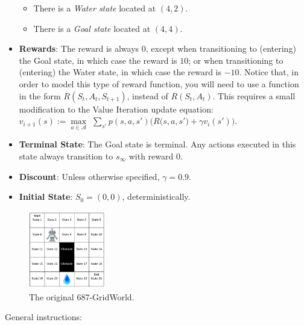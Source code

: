 \documentclass{article}
\begin{document}
\begin{itemize}
\begin{itemize}
        \item There is a \textit{Water state} located at $(4,2)$.
        \item There is a \textit{Goal state} located at $(4,4)$.
    \end{itemize}
    \item \textbf{Rewards}: The reward is always $0$, except when transitioning to  (entering) the Goal state, in which case the reward is $10$; or when transitioning to (entering) the Water state, in which case the reward is $-10$. Notice that, in order to model this type of reward function, you will need to use a function in the form $R(S_t, A_t, S_{t+1})$, instead of $R(S_t, A_t)$. This requires a small modification to the Value Iteration update equation: $v_{i+1}(s) := \underset{a\in\mathcal{A}}{\max}\,\,\sum_{s'} p(s, a, s') \Big( R\big(s,a,s'\big) + \gamma v_i(s') \Big)$.
    \item \textbf{Terminal State}: The Goal state is terminal. Any actions executed in this state always transition to $s_\infty$ with reward $0$.
    \item \textbf{Discount}: Unless otherwise specified, $\gamma=0.9$.
    \item \textbf{Initial State}: $S_0=(0,0)$, deterministically.
\end{itemize}

\begin{figure}[h!!!]
    \centering
    \includegraphics[width=0.3\textwidth]{HW_figs/687_gridworld.png}
    \caption{The original 687-GridWorld.}
    \label{fig:gridworld}
\end{figure}



\vspace{0.35in}

\vspace{0.15in}
General instructions:
\end{document}
